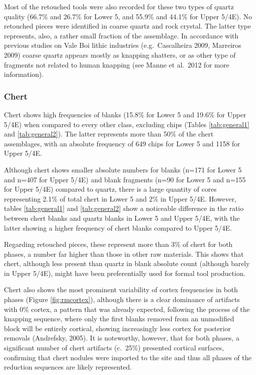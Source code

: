 \documentclass[12pt,twoside]{reedthesis}
\begin{document}
Most of the retouched tools were also recorded for these two types of quartz quality (66.7\% and 26.7\% for Lower 5, and 55.9\% and 44.1\% for Upper 5/4E). No retouched pieces were identified in coarse quartz and rock crystal. The latter type represents, also, a rather small fraction of the assemblage. In accordance with previous studies on Vale Boi lithic industries (e.g.~Cascalheira 2009, Marreiros 2009) coarse quartz appears mostly as knapping shatters, or as other type of fragments not related to human knapping (see Manne et al.~2012 for more information).

\hypertarget{chert}{%
\subsubsection{Chert}\label{chert}}

Chert shows high frequencies of blanks (15.8\% for Lower 5 and 19.6\% for Upper 5/4E) when compared to every other class, excluding chips (Tables \ref{tab:general1} and \ref{tab:general2}). The latter represents more than 50\% of the chert assemblages, with an absolute frequency of 649 chips for Lower 5 and 1158 for Upper 5/4E.

Although chert shows smaller absolute numbers for blanks (n=171 for Lower 5 and n=407 for Upper 5/4E) and blank fragments (n=90 for Lower 5 and n=155 for Upper 5/4E) compared to quartz, there is a large quantity of cores representing 2.1\% of total chert in Lower 5 and 2\% in Upper 5/4E. However, tables \ref{tab:general1} and \ref{tab:general2} show a noticeable difference in the ratio between chert blanks and quartz blanks in Lower 5 and Upper 5/4E, with the latter showing a higher frequency of chert blanks compared to Upper 5/4E.

Regarding retouched pieces, these represent more than 3\% of chert for both phases, a number far higher than those in other raw materials. This shows that chert, although less present than quartz in blank absolute count (although barely in Upper 5/4E), might have been preferentially used for formal tool production.

Chert also shows the most prominent variability of cortex frequencies in both phases (Figure \ref{fig:rmcortex}), although there is a clear dominance of artifacts with 0\% cortex, a pattern that was already expected, following the process of the knapping sequence, where only the first blanks removed from an unmodified block will be entirely cortical, showing increasingly less cortex for posterior removals (Andrefsky, 2005). It is noteworthy, however, that for both phases, a significant number of chert artifacts (c.~25\%) presented cortical surfaces, confirming that chert nodules were imported to the site and thus all phases of the reduction sequences are likely represented.
\end{document}
